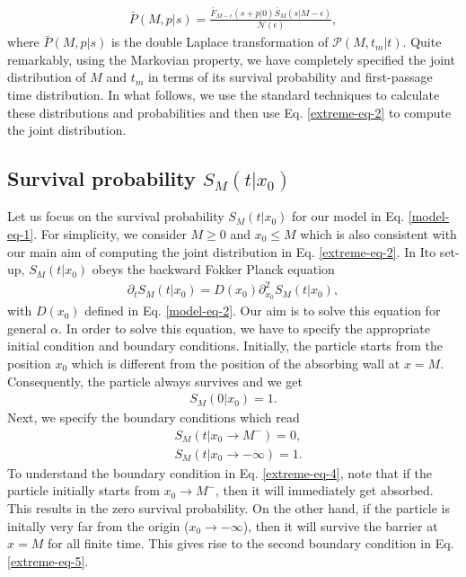 \documentclass[showpacs,amsmath,amssymb,aps,pre,twocolumn,]{revtex4-1}
\def\bluew#1{{\color{black} #1}}
\begin{document}
\begin{align}
\bar{P}(M, p|s)= \frac{ \bar{F}_{M-\epsilon}(s+p|0) \bar{S}_M(s|M-\epsilon)}{\mathcal{N} (\epsilon)},
\label{extreme-eq-2}
\end{align}
where $\bar{P}(M, p|s)$ is the double Laplace transformation of $\mathcal{P}(M, t_m|t)$. Quite remarkably, using the Markovian property, we have completely specified the joint distribution of $M$ and $t_m$ in terms of its survival probability and first-passage time distribution. In what follows, we use the standard techniques to calculate these distributions and probabilities and then use Eq. \eqref{extreme-eq-2} to compute the joint distribution. 

\subsection{Survival probability $S_M(t|x_0)$}
Let us focus on the survival probability $S_M(t|x_0)$ for our model in Eq. \eqref{model-eq-1}. For simplicity, we consider $M \geq 0$ and $x_0 \leq M$ which is also consistent with our main aim of computing the joint distribution in Eq. \eqref{extreme-eq-2}. In Ito set-up, $S_M(t|x_0)$ obeys the backward Fokker Planck equation \bluew{\cite{Redner}}
\begin{align}
\partial _t S_M(t|x_0) = D(x_0) \partial _{x_0 } ^2 S_M(t|x_0),
\label{extreme-eq-3}
\end{align}
with $D(x_0)$ defined in Eq. \eqref{model-eq-2}. Our aim is to solve this equation for general $\alpha$. In order to solve this equation, we have to specify the appropriate initial condition and boundary conditions. Initially, the particle starts from the position $x_0$ which is different from the position of the absorbing wall at $x=M$.  Consequently, the particle always survives and we get
\begin{align}
S_M(0|x_0) = 1. \label{extreme-eq-4-new}
\end{align}
Next, we specify the boundary conditions which read 
\begin{align}
& S_M \left(t|x_0 \to M^- \right) = 0, \label{extreme-eq-4} \\
& S_M \left(t|x_0 \to -\infty \right) = 1. \label{extreme-eq-5}
\end{align} 
To understand the boundary condition in Eq. \eqref{extreme-eq-4}, note that if the particle initially starts from $x_0 \to M^-$, then it will immediately get absorbed. This results in the zero survival probability. On the other hand, if the particle is initally very far from the origin ($x_0 \to -\infty$), then it will survive the barrier at $x=M$ for all finite time. This gives rise to the second boundary condition in Eq. \eqref{extreme-eq-5}.
\end{document}
